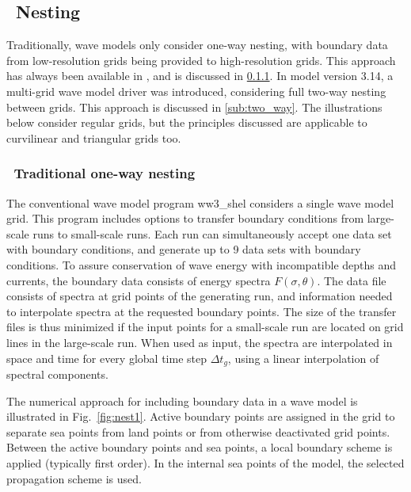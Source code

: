 \vssub
\subsection{~Nesting} \label{sub:num_nest}

\noindent
Traditionally, wave models only consider one-way nesting, with boundary data
from low-resolution grids being provided to high-resolution grids. This
approach has always been available in \ws, and is discussed in
\para\ref{sub:one_way}. In model version 3.14, a multi-grid wave model
driver was introduced, considering full two-way nesting between grids. This
approach is discussed in \para\ref{sub:two_way}. The illustrations below
consider regular grids, but the principles discussed are applicable to
curvilinear and triangular grids too.


\vssub
\subsubsection{~Traditional one-way nesting} \label{sub:one_way}
\vssub



The conventional wave model program {\file ww3\_shel} considers a single wave
model grid. This program includes options to transfer boundary conditions from
large-scale runs to small-scale runs. Each run can simultaneously accept one
data set with boundary conditions, and generate up to 9 data sets with
boundary conditions. To assure conservation of wave energy with incompatible
depths and currents, the boundary data consists of energy spectra
$F(\sigma,\theta)$. The data file consists of spectra at grid points of the
generating run, and information needed to interpolate spectra at the requested
boundary points. The size of the transfer files is thus minimized if the input
points for a small-scale run are located on grid lines in the large-scale
run. When used as input, the spectra are interpolated in space and time for
every global time step $\Delta t_g$, using a linear interpolation of spectral
components. 

The numerical approach for including boundary data in a wave model is
illustrated in Fig.~\ref{fig:nest1}. Active boundary points are assigned in
the grid to separate sea points from land points or from otherwise deactivated
grid points. Between the active boundary points and sea points, a local
boundary scheme is applied (typically first order). In the internal sea points
of the model, the selected propagation scheme is used.

